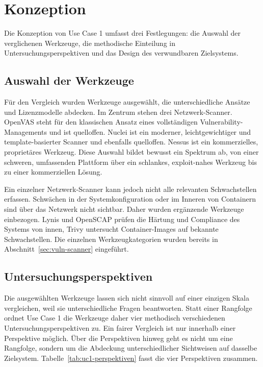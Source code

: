 \section{Konzeption}
\label{sec:uc1-konzeption}

Die Konzeption von Use Case 1 umfasst drei Festlegungen: die Auswahl der verglichenen Werkzeuge, die
methodische Einteilung in Untersuchungsperspektiven und das Design des verwundbaren Zielsystems.

\subsection{Auswahl der Werkzeuge}
\label{subsec:uc1-werkzeuge}

Für den Vergleich wurden Werkzeuge ausgewählt, die unterschiedliche Ansätze und Lizenzmodelle
abdecken. Im Zentrum stehen drei Netzwerk-Scanner. OpenVAS steht für den klassischen Ansatz eines
vollständigen Vulnerability-Managements und ist quelloffen. Nuclei ist ein moderner,
leichtgewichtiger und template-basierter Scanner und ebenfalls quelloffen. Nessus ist ein
kommerzielles, proprietäres Werkzeug. Diese Auswahl bildet bewusst ein Spektrum ab, von einer
schweren, umfassenden Plattform über ein schlankes, exploit-nahes Werkzeug bis zu einer
kommerziellen Lösung.

Ein einzelner Netzwerk-Scanner kann jedoch nicht alle relevanten Schwachstellen erfassen. Schwächen
in der Systemkonfiguration oder im Inneren von Containern sind über das Netzwerk nicht sichtbar.
Daher wurden ergänzende Werkzeuge einbezogen. Lynis und OpenSCAP prüfen die Härtung und Compliance
des Systems von innen, Trivy untersucht Container-Images auf bekannte Schwachstellen. Die einzelnen
Werkzeugkategorien wurden bereits in Abschnitt~\ref{sec:vuln-scanner} eingeführt.

\subsection{Untersuchungsperspektiven}
\label{subsec:uc1-perspektiven}

Die ausgewählten Werkzeuge lassen sich nicht sinnvoll auf einer einzigen Skala vergleichen, weil sie
unterschiedliche Fragen beantworten. Statt einer Rangfolge ordnet Use Case 1 die Werkzeuge daher
vier methodisch verschiedenen Untersuchungsperspektiven zu. Ein fairer Vergleich ist nur innerhalb
einer Perspektive möglich. Über die Perspektiven hinweg geht es nicht um eine Rangfolge, sondern um
die Abdeckung unterschiedlicher Sichtweisen auf dasselbe Zielsystem. Tabelle~\ref{tab:uc1-perspektiven}
fasst die vier Perspektiven zusammen.

